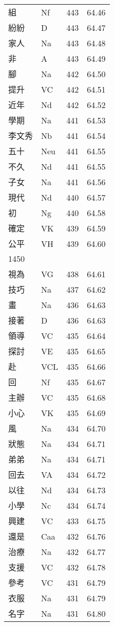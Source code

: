 \documentclass[twocolumn]{book}
\begin{document}
\begin{supertabular}{llrr}
組 & Nf & 443 &  64.46\\
紛紛 & D & 443 &  64.47\\
家人 & Na & 443 &  64.48\\
非 & A & 443 &  64.49\\
腳 & Na & 442 &  64.50\\
提升 & VC & 442 &  64.51\\
近年 & Nd & 442 &  64.52\\
學期 & Na & 441 &  64.53\\
李文秀 & Nb & 441 &  64.54\\
五十 & Neu & 441 &  64.55\\
不久 & Nd & 441 &  64.55\\
子女 & Na & 441 &  64.56\\
現代 & Nd & 440 &  64.57\\
初 & Ng & 440 &  64.58\\
確定 & VK & 439 &  64.59\\
公平 & VH & 439 &  64.60\\
1450\\
視為 & VG & 438 &  64.61\\
技巧 & Na & 437 &  64.62\\
畫 & Na & 436 &  64.63\\
接著 & D & 436 &  64.63\\
領導 & VC & 435 &  64.64\\
探討 & VE & 435 &  64.65\\
赴 & VCL & 435 &  64.66\\
回 & Nf & 435 &  64.67\\
主辦 & VC & 435 &  64.68\\
小心 & VK & 435 &  64.69\\
風 & Na & 434 &  64.70\\
狀態 & Na & 434 &  64.71\\
弟弟 & Na & 434 &  64.71\\
回去 & VA & 434 &  64.72\\
以往 & Nd & 434 &  64.73\\
小學 & Nc & 434 &  64.74\\
興建 & VC & 433 &  64.75\\
還是 & Caa & 432 &  64.76\\
治療 & Na & 432 &  64.77\\
支援 & VC & 432 &  64.78\\
參考 & VC & 431 &  64.79\\
衣服 & Na & 431 &  64.79\\
名字 & Na & 431 &  64.80\\

\end{supertabular}
\end{document}
